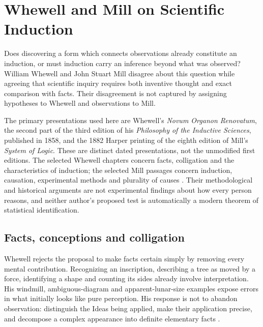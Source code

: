 \chapter{Whewell and Mill on Scientific Induction}
\label{sec:p15-whewell-mill}

Does discovering a form which connects observations already constitute an
induction, or must induction carry an inference beyond what was observed?
William Whewell and John Stuart Mill disagree about this question while
agreeing that scientific inquiry requires both inventive thought and exact
comparison with facts. Their disagreement is not captured by assigning
hypotheses to Whewell and observations to Mill.

The primary presentations used here are Whewell's \emph{Novum Organon
Renovatum}, the second part of the third edition of his \emph{Philosophy
of the Inductive Sciences}, published in 1858, and the 1882 Harper
printing of the eighth edition of Mill's \emph{System of Logic}.
These are distinct dated presentations, not the unmodified first editions.
The selected Whewell chapters concern facts, colligation and the
characteristics of induction; the selected Mill passages concern
induction, causation, experimental methods and plurality of causes
\parencite[Book~II, chs.~III--V, pp.~50--96]{Whewell1858NovumPG}
\parencite[Book~III, chs.~I--II, V, VIII and X]{Mill1882SystemLogicPG}.
Their methodological and historical arguments are not experimental findings
about how every person reasons, and neither author's proposed test is
automatically a modern theorem of statistical identification.

\section{Facts, conceptions and colligation}
\label{sec:p15-wm-colligation}

Whewell rejects the proposal to make facts certain simply by removing every
mental contribution. Recognizing an inscription, describing a tree as moved
by a force, identifying a shape and counting its sides already involve
interpretation. His windmill, ambiguous-diagram and apparent-lunar-size
examples expose errors in what initially looks like pure perception.
His response is not to abandon observation: distinguish the Ideas being
applied, make their application precise, and decompose a complex appearance
into definite elementary facts
\parencite[II.III.1--3, pp.~50--54]{Whewell1858NovumPG}.

